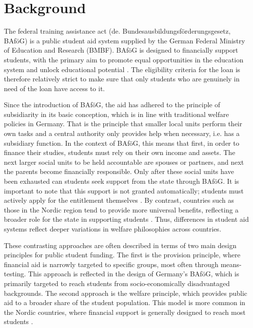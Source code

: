 \section{Background}

The federal training assistance act (de. Bundesausbildungsförderungsgesetz, BAföG) is a public student aid system supplied by the German Federal Ministry of Education and Research (BMBF). BAföG is designed to financially support students, with the primary aim to promote equal opportunities in the education system and unlock educational potential \citep{meier_bafog_2024}. The eligibility criteria for the loan is therefore relatively strict to make sure that only students who are genuinely in need of the loan have access to it.

Since the introduction of BAföG, the aid has adhered to the principle of subsidiarity in its basic conception, which is in line with traditional welfare policies in Germany. 
That is the principle that smaller local units perform their own tasks and a central authority only provides help when necessary, i.e. has a subsidiary function. 
In the context of BAföG, this means that first, in order to finance their studies, students must rely on their own income and assets. 
The next larger social units to be held accountable are spouses or partners, and next the parents become financially responsible. 
Only after these social units have been exhausted can students seek support from the state through BAföG. 
It is important to note that this support is not granted automatically; students must actively apply for the entitlement themselves \citep{staack_von_2017}. 
By contrast, countries such as those in the Nordic region tend to provide more universal benefits, reflecting a broader role for the state in supporting students \citep{gwosc_krisenbewaltigung_2022, schwarz_study_2004}. 
Thus, differences in student aid systems reflect deeper variations in welfare philosophies across countries.

These contrasting approaches are often described in terms of two main design principles for public student funding. The first is the provision principle, where financial aid is narrowly targeted to specific groups, most often through means-testing. This approach is reflected in the design of Germany’s BAföG, which is primarily targeted to reach students from socio-economically disadvantaged backgrounds. The second approach is the welfare principle, which provides public aid to a broader share of the student population. This model is more common in the Nordic countries, where financial support is generally designed to reach most students \citep{gwosc_krisenbewaltigung_2022, oecd_education_2024}.


